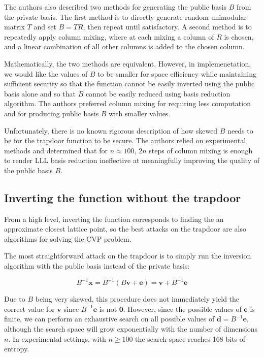 \documentclass[letterpaper,12pt]{article}
\begin{document}
The authors also described two methods for generating the public basis $B$ from the private basis. The first method is to directly generate random unimodular matrix $T$ and set $B = TR$, then repeat until satisfactory. A second method is to repeatedly apply column mixing, where at each mixing a column of $R$ is chosen, and a linear combination of all other columns is added to the chosen column.

Mathematically, the two methods are equivalent. However, in implemenetation, we would like the values of $B$ to be smaller for space efficiency while maintaining sufficient security so that the function cannot be easily inverted using the public basis alone and so that $B$ cannot be easily reduced using basis reduction algorithm. The authors preferred column mixing for requiring less computation and for producing public basis $B$ with smaller values.

Unfortunately, there is no known rigorous description of how skewed $B$ needs to be for the trapdoor function to be secure. The authors relied on experimental methods and determined that for $n \approx 100$, $2n$ steps of column mixing is enough to render LLL basis reduction ineffective at meaningfully improving the quality of the public basis $B$.

\subsection{Inverting the function without the trapdoor}
From a high level, inverting the function corresponds to finding the an approximate closest lattice point, so the best attacks on the trapdoor are also algorithms for solving the CVP problem.

The most straightforward attack on the trapdoor is to simply run the inversion algorithm with the public basis instead of the private basis:

$$
B^{-1}\mathbf{x} = B^{-1}(B\mathbf{v} + \mathbf{e}) = \mathbf{v} + B^{-1}\mathbf{e}
$$

Due to $B$ being very skewed, this procedure does not immediately yield the correct value for $\mathbf{v}$ since $B^{-1}\mathbf{e}$  is not $\mathbf{0}$. However, since the possible values of $\mathbf{e}$ is finite, we can perform an exhaustive search on all possible values of $\mathbf{d} = B^{-1}\mathbf{e}$, although the search space will grow exponentially with the number of dimensions $n$. In experimental settings, with $n \geq 100$ the search space reaches 168 bits of entropy.
\end{document}
